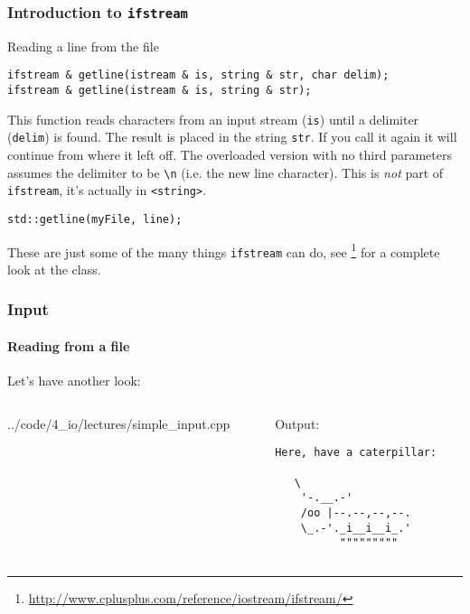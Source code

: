 \documentclass[handout]{beamer}
\begin{document}
\begin{frame}[fragile]
  \frametitle{Introduction to \texttt{ifstream}}


	\begin{block}{Reading a line from the file}
  	\begin{lstlisting}[aboveskip=0pt]
ifstream & getline(istream & is, string & str, char delim);
ifstream & getline(istream & is, string & str);
  	\end{lstlisting}
  	This function reads characters from an input stream (\texttt{is}) until a delimiter (\texttt{delim}) is found.  The result is placed in the string \texttt{str}.  If you call it again it will continue from where it left off.
  	\newline\pause
  	The overloaded version with no third parameters assumes the delimiter to be \texttt{\textbackslash{}n} (i.e. the new line character).
  	\newline\pause
  	This is \textit{not} part of \texttt{ifstream}, it's actually in \texttt{<string>}.
  	\begin{lstlisting}[belowskip=0pt]
  std::getline(myFile, line);
  	\end{lstlisting}
  \end{block}
  
  These are just some of the many things \texttt{ifstream} can do, see \footnote{\url{http://www.cplusplus.com/reference/iostream/ifstream/}} for a complete look at the class.

\end{frame}

\begin{frame}[fragile]
	\frametitle{Input}
	\framesubtitle{Reading from a file}
	
	Let's have another look:
	\begin{columns}[t]
	  \begin{column}[T]{0.5\textwidth}
    		{../code/4_io/lectures/simple_input.cpp}
		\end{column}
		\begin{column}[T]{0.5\textwidth}
		  Output:
			\begin{verbatim}Here, have a caterpillar:
						
   \
    '-.__.-'
    /oo |--.--,--,--.
    \_.-'._i__i__i_.'
          """""""""
		\end{verbatim}
		\end{column}
	\end{columns}
\end{frame}
\end{document}
